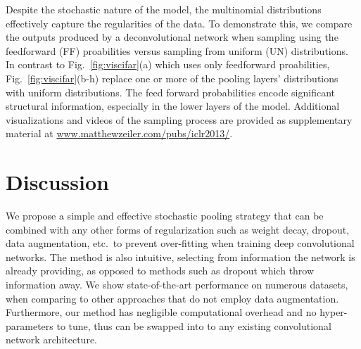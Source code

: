 \documentclass{article} %
\newcommand{\fig}[1]{Fig.~\ref{fig:#1}}
\begin{document}
Despite the stochastic nature of the model, the multinomial distributions
effectively capture the regularities of the data. To demonstrate this, we compare the outputs
produced by a deconvolutional network when sampling using the feedforward (FF) proabilities versus
sampling from uniform (UN) distributions.
In contrast to \fig{viscifar}(a) which uses only feedforward proabilities, \fig{viscifar}(b-h)
replace one or more of the pooling layers' distributions with uniform distributions.
The feed forward
probabilities encode significant structural information, especially in
the lower layers of the model.  Additional visualizations and videos of
the sampling process are provided as supplementary material at
\url{www.matthewzeiler.com/pubs/iclr2013/}.




\vspace{-4mm}
\section{Discussion}
\vspace{-3mm}
We propose a simple and effective stochastic pooling
strategy that can be combined with any other forms of regularization
such as weight decay, dropout, data augmentation, etc.~to prevent
over-fitting when training deep convolutional networks. The method is
also intuitive, selecting from information the network is already
providing, as opposed to methods such as dropout which throw
information away. We show state-of-the-art performance on numerous
datasets, when comparing to other approaches that do not employ data
augmentation. Furthermore, our method has negligible computational
overhead and no hyper-parameters to tune, thus can be swapped into to
any existing convolutional network architecture.


\baselineskip=1pt


\end{document}

